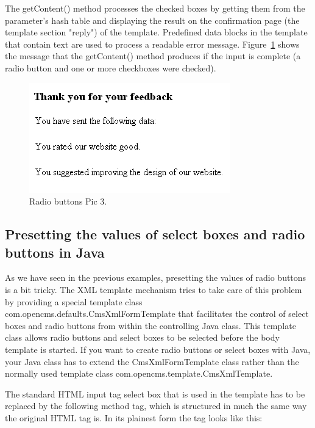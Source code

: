 The {\meth getContent()} method processes the checked boxes by getting them from
the parameter's hash table and displaying the result on the confirmation
page (the template section  {\name "reply")} of the template. Predefined data
blocks in the template that contain text are used to process a readable error message.
Figure~\ref{Feedback3} shows the message that the {\meth getContent()} method produces if the input
is complete (a radio button and one or more checkboxes were checked).

\begin{figure}
\begin{center}
\includegraphics[clip,width=0.6\linewidth]{pics/modules/46}
\end{center}
\caption[Radio buttons Pic 3]{Radio buttons Pic 3.}
\label{Feedback3}
\end{figure}


\subsection {Presetting the values of select boxes and radio buttons in Java}

As we have seen in the previous examples, presetting the values of radio
buttons is a bit tricky. The XML template mechanism tries to take care of this problem by providing
a special template class {\class com.opencms.defaults.CmsXmlFormTemplate}
that facilitates the control of select boxes and radio buttons from within the controlling
Java class. This template class allows radio buttons and select boxes to
be selected before the body template is started. If you want to create
radio buttons or select boxes with Java, your Java class has to extend
the {\class CmsXmlFormTemplate} class rather than the normally used template class
{\class com.opencms.template.CmsXmlTemplate}.

The standard HTML input tag select box that is used in the template
has to be replaced by the following method tag, which is structured in
much the same way the original HTML tag is. In its plainest form the tag
looks like this:

